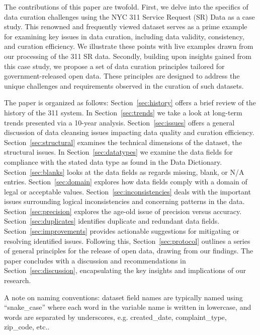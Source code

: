 \documentclass[12pt, titlepage]{article}
\begin{document}
The contributions of this paper are twofold. First, we delve into
the specifics of data curation challenges using the NYC 311 Service
Request (SR) Data as a case study. This renowned and frequently viewed 
dataset serves as a prime example for examining key issues in data curation, 
including data validity, consistency, and curation efficiency. 
We illustrate these points with live examples drawn from our processing of the 311 SR data. 
Secondly, building upon insights gained from this case study, we 
propose a set of data curation principles tailored for government-released open data. 
These principles are designed to address the unique challenges 
and requirements observed in the curation of such datasets.

The paper is organized as follows:
Section~\ref{sec:history} offers a brief review of the history of the 311 system. In 
Section~\ref{sec:trends} we take a look at long-term trends presented via a 10-year analysis.
Section~\ref{sec:issues} offers a general discussion of data cleansing issues
impacting data quality and curation efficiency. Section~\ref{sec:structural} examines
the technical dimensions of the dataset, the structural issues. 
In Section~\ref{sec:datatypes} we examine the data fields for compliance 
with the stated data type as found in the Data Dictionary. Section~\ref{sec:blanks} looks
at the data fields as regards missing, blank, or N/A entries. Section~\ref{sec:domain} explores
how data fields comply with a domain of legal or acceptable values. Section~\ref{sec:inconsistencies}
deals with the important issues surrounding logical inconsistencies 
and concerning patterns in the data. Section~\ref{sec:precision} 
explores the age-old issue of precision versus accuracy. Section~\ref{sec:duplicates}
identifies duplicate and redundant data fields. Section~\ref{sec:improvements} provides 
actionable suggestions for mitigating or resolving identified issues. 
Following this, Section~\ref{sec:protocol} outlines a series of general 
principles for the release of open data, drawing from our findings. The 
paper concludes with a discussion and recommendations in 
Section~\ref{sec:discussion}, encapsulating the key insights and 
implications of our research.

A note on naming conventions: dataset field names are typically 
named using ``snake\_case'' where each word in the variable name 
is written in lowercase, and words are separated by 
underscores, e.g. created\_date, complaint\_type, zip\_code, etc..   
\end{document}
